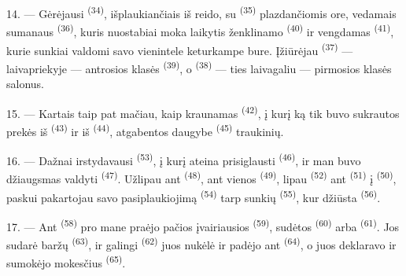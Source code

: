 \VUsaut{4.0mm}
\VUsaut{3.0mm}

14. --- Gėrėjausi  \textsuperscript{(34)},
išplaukiančiais iš reido, su  \textsuperscript{(35)} plazdančiomis
ore, vedamais sumanaus  \textsuperscript{(36)}, kuris nuostabiai moka
laikytis  ženklinamo  \textsuperscript{(40)} ir
 vengdamas  \textsuperscript{(41)}, kurie sunkiai
valdomi savo vienintele keturkampe bure. Įžiūrėjau 
\textsuperscript{(37)} --- laivapriekyje --- antrosios klasės 
\textsuperscript{(39)}, o  \textsuperscript{(38)} --- ties
laivagaliu --- pirmosios klasės salonus.

15. --- Kartais taip pat mačiau, kaip kraunamas 
\textsuperscript{(42)}, į kurį ką tik buvo sukrautos prekės iš 
\textsuperscript{(43)} ir iš  \textsuperscript{(44)}, atgabentos
daugybe  \textsuperscript{(45)} traukinių.

\VUsaut{3.0mm}
\VUsaut{3.0mm}

16. --- Dažnai irstydavausi  \textsuperscript{(53)}, į kurį
ateina prisiglausti  \textsuperscript{(46)}, ir man buvo džiaugsmas
valdyti  \textsuperscript{(47)}. Užlipau ant 
\textsuperscript{(48)}, ant vienos  \textsuperscript{(49)}, lipau
 \textsuperscript{(52)} ant  \textsuperscript{(51)} į
 \textsuperscript{(50)}, paskui pakartojau savo pasiplaukiojimą
 \textsuperscript{(54)} tarp sunkių 
\textsuperscript{(55)}, kur džiūsta  \textsuperscript{(56)}.

17. --- Ant  \textsuperscript{(58)} pro mane praėjo pačios
įvairiausios  \textsuperscript{(59)}, sudėtos 
\textsuperscript{(60)} arba  \textsuperscript{(61)}. Jos sudarė
baržų  \textsuperscript{(63)}, ir galingi 
\textsuperscript{(62)} juos nukėlė ir padėjo ant 
\textsuperscript{(64)}, o  juos deklaravo ir sumokėjo mokesčius
 \textsuperscript{(65)}.

